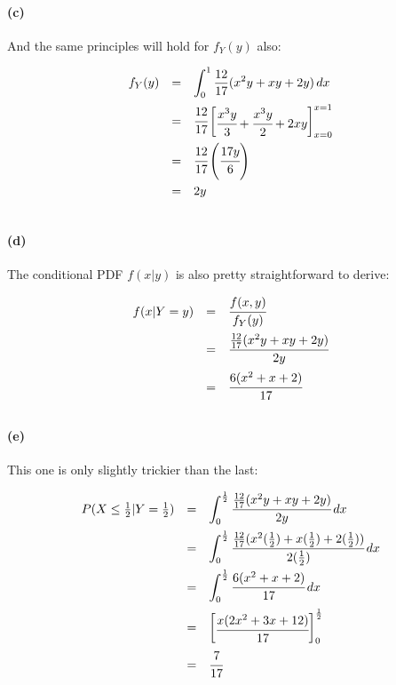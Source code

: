 \documentclass[a4paper]{article}
\begin{document}
\paragraph{(c)} And the same principles will hold for $f_{Y}(y)$ also:

\begin{equation}
\begin{array}{rcl}
f_{Y}(y) & = & \displaystyle\int^{1}_{0} \frac{12}{17} (x^2y + xy + 2y) \,dx \\[.15in]
& = & \cfrac{12}{17} \begin{bmatrix} \cfrac{x^3y}{3} + \cfrac{x^3y}{2} + 2xy \end{bmatrix}^{x = 1}_{x = 0} \\[.15in]
& = & \cfrac{12}{17} \left( \cfrac{17y}{6} \right) \\[.17in]
& = & 2y \\[.15in]
\end{array}
\end{equation}

\paragraph{(d)} The conditional PDF $f(x|y)$ is also pretty straightforward to derive:

\begin{equation}
\begin{array}{rcl}
f(x | Y=y) & = & \cfrac{f(x, y)}{f_{Y}(y)} \\[.15in]
& = & \cfrac{\frac{12}{17} (x^2y + xy + 2y)}{2y} \\[.15in]
& = & \cfrac{6 (x^2 + x + 2)}{17} \\[.15in]
\end{array}
\end{equation}

\paragraph{(e)} This one is only slightly trickier than the last:

\begin{equation}
\begin{array}{rcl}
P(X \le \frac{1}{2} | Y = \frac{1}{2}) & = & \displaystyle\int^{\frac{1}{2}}_{0} \cfrac{\frac{12}{17} (x^2y + xy + 2y)}{2y} \,dx \\[.15in]
& = & \displaystyle\int^{\frac{1}{2}}_{0} \cfrac{\frac{12}{17} (x^2(\frac{1}{2}) + x(\frac{1}{2}) + 2(\frac{1}{2}))}{2(\frac{1}{2})} \,dx \\[.15in]
& = & \displaystyle\int^{\frac{1}{2}}_{0} \cfrac{6 (x^2 + x + 2)}{17} \,dx \\[.15in]
& = & \begin{bmatrix} \cfrac{x (2x^2 + 3x + 12)}{17} \end{bmatrix}^{\frac{1}{2}}_{0} \\[.15in]
& = & \cfrac{7}{17} \\[.15in]
\end{array}
\end{equation}
\end{document}
